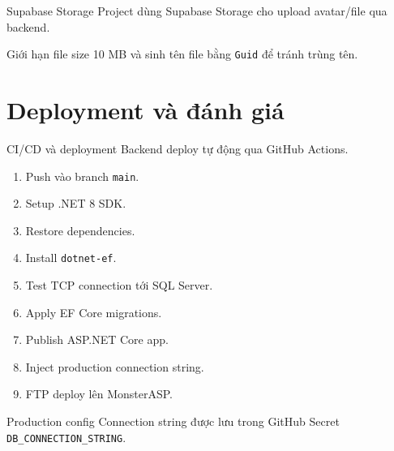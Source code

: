 \documentclass[aspectratio=169,11pt]{beamer}
\begin{document}
\begin{frame}{Supabase Storage}
  Project dùng Supabase Storage cho upload avatar/file qua backend.


  \vspace{0.25cm}
  \small Giới hạn file size 10 MB và sinh tên file bằng \texttt{Guid} để tránh trùng tên.
\end{frame}

\section{Deployment và đánh giá}

\begin{frame}{CI/CD và deployment}
  Backend deploy tự động qua GitHub Actions.

  \begin{enumerate}
    \item Push vào branch \texttt{main}.
    \item Setup .NET 8 SDK.
    \item Restore dependencies.
    \item Install \texttt{dotnet-ef}.
    \item Test TCP connection tới SQL Server.
    \item Apply EF Core migrations.
    \item Publish ASP.NET Core app.
    \item Inject production connection string.
    \item FTP deploy lên MonsterASP.
  \end{enumerate}

  \begin{block}{Production config}
    Connection string được lưu trong GitHub Secret \texttt{DB\_CONNECTION\_STRING}.
  \end{block}
\end{frame}
\end{document}
